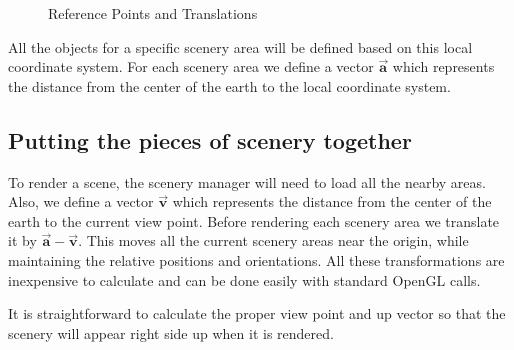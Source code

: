 \documentclass[12pt]{article}
\begin{document}
\begin{figure}[hbt]
  \centerline{                   
  }
  \caption{Reference Points and Translations}
  \label{fig:reference}
\end{figure}

All the objects for a specific scenery area will be defined based on
this local coordinate system.  For each scenery area we define a
vector $\vec{\mathbf{a}}$ which represents the distance from the
center of the earth to the local coordinate system.


\subsection{Putting the pieces of scenery together}

To render a scene, the scenery manager will need to load all the
nearby areas.  Also, we define a vector $\vec{\mathbf{v}}$ which
represents the distance from the center of the earth to the current
view point.  Before rendering each scenery area we translate it by
$\vec{\mathbf{a}} - \vec{\mathbf{v}}$.  This moves all the current
scenery areas near the origin, while maintaining the relative
positions and orientations.  All these transformations are inexpensive
to calculate and can be done easily with standard OpenGL calls.

It is straightforward to calculate the proper view point and up vector
so that the scenery will appear right side up when it is rendered.
\end{document}
